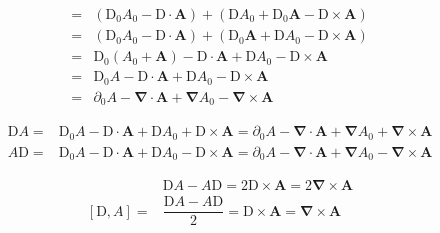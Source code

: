 \documentclass[
]{book}
\theoremstyle{definition}
\theoremstyle{definition}
\theoremstyle{definition}
\theoremstyle{definition}
\theoremstyle{remark}
\begin{document}
\[\begin{aligned}
= & \left(\mathrm{D}_{{\scriptscriptstyle 0}}A_{{\scriptscriptstyle 0}}-\boldsymbol{\mathrm{D}}\cdot\boldsymbol{A}\right)+\left(\boldsymbol{\mathrm{D}}A_{{\scriptscriptstyle 0}}+\mathrm{D}_{{\scriptscriptstyle 0}}\boldsymbol{A}-\boldsymbol{\mathrm{D}}\times\boldsymbol{A}\right)\\
= & \left(\mathrm{D}_{{\scriptscriptstyle 0}}A_{{\scriptscriptstyle 0}}-\boldsymbol{\mathrm{D}}\cdot\boldsymbol{A}\right)+\left(\mathrm{D}_{{\scriptscriptstyle 0}}\boldsymbol{A}+\boldsymbol{\mathrm{D}}A_{{\scriptscriptstyle 0}}-\boldsymbol{\mathrm{D}}\times\boldsymbol{A}\right)\\
= & \mathrm{D}_{{\scriptscriptstyle 0}}\left(A_{{\scriptscriptstyle 0}}+\boldsymbol{A}\right)-\boldsymbol{\mathrm{D}}\cdot\boldsymbol{A}+\boldsymbol{\mathrm{D}}A_{{\scriptscriptstyle 0}}-\boldsymbol{\mathrm{D}}\times\boldsymbol{A}\\
= & \mathrm{D}_{{\scriptscriptstyle 0}}A-\boldsymbol{\mathrm{D}}\cdot\boldsymbol{A}+\boldsymbol{\mathrm{D}}A_{{\scriptscriptstyle 0}}-\boldsymbol{\mathrm{D}}\times\boldsymbol{A}\\
= & \partial_{{\scriptscriptstyle 0}}A-\boldsymbol{\nabla}\cdot\boldsymbol{A}+\boldsymbol{\nabla}A_{{\scriptscriptstyle 0}}-\boldsymbol{\nabla}\times\boldsymbol{A}
\end{aligned}
\]

\[
\begin{aligned}
\mathrm{D}A= & \mathrm{D}_{{\scriptscriptstyle 0}}A-\boldsymbol{\mathrm{D}}\cdot\boldsymbol{A}+\boldsymbol{\mathrm{D}}A_{{\scriptscriptstyle 0}}+\boldsymbol{\mathrm{D}}\times\boldsymbol{A}=\partial_{{\scriptscriptstyle 0}}A-\boldsymbol{\nabla}\cdot\boldsymbol{A}+\boldsymbol{\nabla}A_{{\scriptscriptstyle 0}}+\boldsymbol{\nabla}\times\boldsymbol{A}\\
A\mathrm{D}= & \mathrm{D}_{{\scriptscriptstyle 0}}A-\boldsymbol{\mathrm{D}}\cdot\boldsymbol{A}+\boldsymbol{\mathrm{D}}A_{{\scriptscriptstyle 0}}-\boldsymbol{\mathrm{D}}\times\boldsymbol{A}=\partial_{{\scriptscriptstyle 0}}A-\boldsymbol{\nabla}\cdot\boldsymbol{A}+\boldsymbol{\nabla}A_{{\scriptscriptstyle 0}}-\boldsymbol{\nabla}\times\boldsymbol{A}
\end{aligned}
\]

\[
\begin{aligned}
 & \mathrm{D}A-A\mathrm{D}=2\boldsymbol{\mathrm{D}}\times\boldsymbol{A}=2\boldsymbol{\nabla}\times\boldsymbol{A}\\
\left[\mathrm{D},A\right]= & \dfrac{\mathrm{D}A-A\mathrm{D}}{2}=\boldsymbol{\mathrm{D}}\times\boldsymbol{A}=\boldsymbol{\nabla}\times\boldsymbol{A}
\end{aligned}
\]
\end{document}
